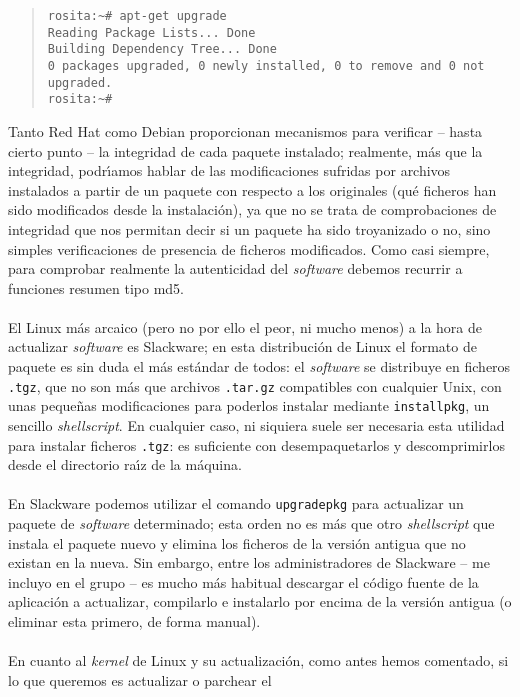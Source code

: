 \begin{quote}
\begin{verbatim}
rosita:~# apt-get upgrade
Reading Package Lists... Done
Building Dependency Tree... Done
0 packages upgraded, 0 newly installed, 0 to remove and 0 not upgraded.
rosita:~# 
\end{verbatim}
\end{quote}
Tanto Red Hat como Debian proporcionan mecanismos para verificar -- hasta
cierto punto -- la integridad de cada paquete instalado; realmente, m\'as que
la integridad, podr\'{\i}amos hablar de las modificaciones sufridas por 
archivos instalados a partir de un paquete con respecto a los originales (qu\'e
ficheros han sido modificados desde la instalaci\'on), ya que no se trata de
comprobaciones de integridad que nos permitan decir si un paquete ha sido 
troyanizado o no, sino simples verificaciones de presencia de ficheros 
modificados. Como casi siempre, para comprobar realmente la autenticidad del 
{\it software} debemos recurrir a funciones resumen tipo {\sc md5}.\\
\\El Linux m\'as arcaico (pero no por ello el peor, ni mucho menos) a
la hora de actualizar {\it software} es Slackware; en esta distribuci\'on de
Linux el formato de paquete es sin duda el m\'as est\'andar de todos: el 
{\it software} se distribuye en ficheros {\tt .tgz}, que no son m\'as que
archivos {\tt .tar.gz} compatibles con cualquier Unix, con unas peque\~nas
modificaciones para poderlos instalar mediante {\tt installpkg}, un sencillo
{\it shellscript}. En cualquier caso, ni siquiera suele ser necesaria esta
utilidad para instalar ficheros {\tt .tgz}: es suficiente con desempaquetarlos
y descomprimirlos desde el directorio ra\'{\i}z de la m\'aquina.\\
\\En Slackware podemos utilizar el comando {\tt upgradepkg} para actualizar un
paquete de {\it software} determinado; esta orden no es m\'as que otro {\it 
shellscript} que instala el paquete nuevo y
elimina los ficheros de la versi\'on antigua que no existan en la nueva. Sin
embargo, entre los administradores de Slackware -- me incluyo en el grupo -- es
mucho m\'as habitual descargar el c\'odigo fuente de la aplicaci\'on a 
actualizar, compilarlo e instalarlo por encima de la versi\'on antigua (o
eliminar esta primero, de forma manual).\\
\\En cuanto al {\it kernel} de Linux y su actualizaci\'on, como antes hemos 
comentado, si lo que queremos es actualizar o parchear el
